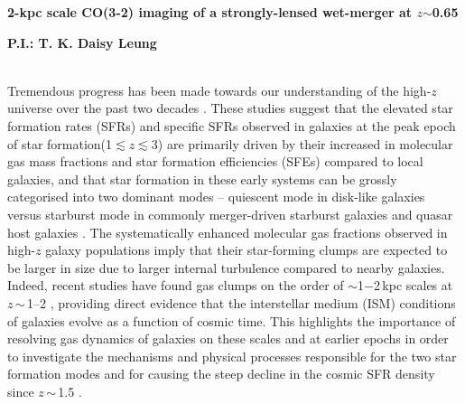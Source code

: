 \documentclass[11pt,a4paper,twoside,graphicx,color]{article}
\newcommand{\cco}{\mbox{CO(3-2)}\xspace}
\newcommand{\ssim}{\,$\sim$\,}
\newcommand{\SF}{star formation\xspace}
\newcommand{\galpop}{galaxy populations\xspace}
\newcommand{\SB}{starburst\xspace}
\newcommand{\highz}{high-$z$\xspace}
\begin{document}
%
%
\begin{center}{\LARGE \bf
2-kpc scale \cco imaging of a strongly-lensed wet-merger at $z$$\sim$0.65
}\end{center}
\centerline{\bf P.I.: T. K. Daisy Leung}
\vspace{0.5em}
 \\
\indent Tremendous progress has been made towards our understanding of the \highz
universe over the past two decades \citep[see recent reviews by][]{CW13,Madau14a, Casey14a}. These studies
suggest that the elevated \SF rates (SFRs) and specific SFRs observed in galaxies at
the peak epoch of \SF (1$\lesssim$$z$$\lesssim$3) are
primarily driven by their increased in molecular gas mass fractions and \SF efficiencies (SFEs) compared to
local galaxies, and that \SF in these early systems can be grossly categorised into
two dominant modes -- quiescent mode in disk-like galaxies versus starburst mode in commonly merger-driven
 \SB galaxies and quasar host galaxies \citep[e.g.][]{Sargent12a}.
The systematically enhanced molecular gas fractions observed in \highz
\galpop imply that their star-forming clumps are expected to be larger in size due to
larger internal turbulence
compared to nearby galaxies.  %
Indeed, recent studies have found gas clumps on the order of
$\sim$1$-$2\,kpc scales at $z$\ssim1--2 \citep[e.g.][]{Genzel11a, Swinbank12a, Swinbank12b},
providing direct evidence that the
interstellar medium (ISM) conditions of galaxies evolve as a function of cosmic time. This
highlights the importance of resolving gas dynamics of galaxies on these scales
and at earlier epochs in order to investigate the
mechanisms and physical processes responsible for %
the two \SF modes and for causing the steep decline in the cosmic SFR density since $z$\ssim1.5 \citep[e.g.][]{Lagos11a,Popping12a}.
\end{document}
